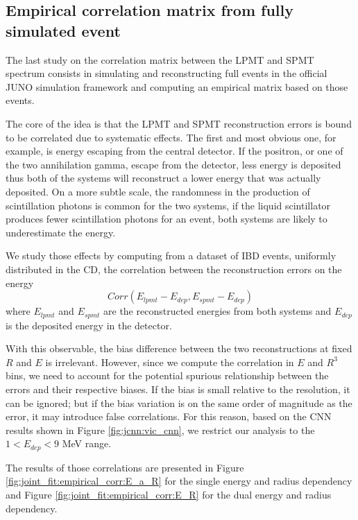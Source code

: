 \documentclass[../main.tex]{subfiles}
\begin{document}
\subsection{Empirical correlation matrix from fully simulated event}

The last study on the correlation matrix between the LPMT and SPMT spectrum consists in simulating and reconstructing full events in the official JUNO simulation framework and computing an empirical matrix based on those events.

The core of the idea is that the LPMT and SPMT reconstruction errors is bound to be correlated due to systematic effects. The first and most obvious one, for example, is energy escaping from the central detector. If the positron, or one of the two annihilation gamma, escape from the detector, less energy is deposited thus both of the systems will reconstruct a lower energy that was actually deposited. On a more subtle scale, the randomness in the production of scintillation photons is common for the two systems, if the liquid scintillator produces fewer scintillation photons for an event, both systems are likely to underestimate the energy.

We study those effects by computing from a dataset of IBD events, uniformly distributed in the CD, the correlation between the reconstruction errors on the energy
\begin{equation}
  Corr(E_{lpmt} - E_{dep}, E_{spmt} - E_{dep})
\end{equation}
where $E_{lpmt}$ and $E_{spmt}$ are the reconstructed energies from both systems and $E_{dep}$ is the deposited energy in the detector.

With this observable, the bias difference between the two reconstructions at fixed $R$ and $E$ is irrelevant. However, since we compute the correlation in $E$ and $R^3$ bins, we need to account for the potential spurious relationship between the errors and their respective biases. If the bias is small relative to the resolution, it can be ignored; but if the bias variation is on the same order of magnitude as the error, it may introduce false correlations. For this reason, based on the CNN results shown in Figure \ref{fig:jcnn:vic_cnn}, we restrict our analysis to the $1 < E_{dep} < 9$ MeV range.

The results of those correlations are presented in Figure \ref{fig:joint_fit:empirical_corr:E_a_R} for the single energy and radius dependency and Figure \ref{fig:joint_fit:empirical_corr:E_R} for the dual energy and radius dependency.
\end{document}
